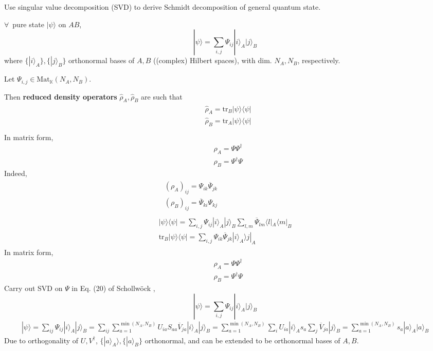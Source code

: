 \documentclass[10pt]{amsart}
\begin{document}
\begin{multicols*}{2}
Use singular value decomposition (SVD) to derive Schmidt decomposition of general quantum state. 

$\forall \, $ pure state $|\psi \rangle$ on $AB$, 
\[
|\psi \rangle = \sum_{i,j} \Psi_{ij}|i\rangle_A |j\rangle_B
\]
where $\lbrace |i\rangle_A \rbrace, \lbrace |j\rangle_B \rbrace$ orthonormal bases of $A,B$ ((complex) Hilbert spaces), with dim. $N_A,N_B$, respectively.  

Let $\Psi_{i,j} \in \text{Mat}_{\mathbb{K}}(N_A,N_B)$.  

Then \textbf{reduced density operators} $\widehat{\rho}_A,\widehat{\rho}_B$ are such that 
\[
\begin{gathered}
\begin{aligned} 
	& \widehat{\rho}_A = \text{tr}_B|\psi \rangle \langle \psi | \\ 
	& \widehat{\rho}_B = \text{tr}_A|\psi \rangle \langle \psi | \\ 
\end{aligned}
\end{gathered}
\]
In matrix form, 
\[
\begin{aligned}
	& \rho_A = \Psi \Psi^{\dag} \\ 
	& \rho_B = \Psi^{\dag} \Psi 
\end{aligned}
\]
Indeed, 
\[
\begin{gathered}
\begin{aligned} 
	& (\rho_A)_{ij} = \Psi_{ik} \overline{\Psi}_{jk} \\
	& (\rho_B)_{ij} = \overline{\Psi}_{ki}  \Psi_{kj} \end{aligned} \\
\begin{gathered}
|\psi \rangle \langle \psi | = \sum_{i,j} \Psi_{ij} |i\rangle_A |j\rangle_B \sum_{l,m} \overline{\Psi}_{lm}\langle l |_A \langle m |_B \\
\text{tr}_B|\psi \rangle \langle \psi | = \sum_{i,j} \Psi_{ik} \overline{\Psi}_{jk} |i \rangle_A \rangle j |_A
\end{gathered}
\end{gathered}
\]
In matrix form, 
\[
\begin{aligned}
	& \rho_A = \Psi \Psi^{\dag} \\ 
	&  \rho_B = \Psi^{\dag} \Psi
\end{aligned}
\]
Carry out SVD on $\Psi$ in Eq. (20) of Schollw\"{o}ck \cite{Scho2010}, 
\[
|\psi \rangle = \sum_{i,j} \Psi_{ij} |i\rangle_A |j\rangle_B
\]
\[
\begin{gathered}
|\psi \rangle = \sum_{ij} \Psi_{ij} | i \rangle_A |j \rangle_B = \sum_{ij} \sum_{a=1}^{\min{(N_A,N_B)}} U_{ia} S_{aa} \overline{V}_{ja} |i \rangle_A | j \rangle_B = \sum_{a=1}^{ \min{(N_A,N_B)}} \sum_i U_{ia} | i \rangle_A s_a \sum_j \overline{V}_{ja} | j \rangle_B = \sum_{a=1}^{ \min{ (N_A,N_B)} } s_a |a \rangle_A |a\rangle_B
\end{gathered}
\]
Due to orthogonality of $U,V^{\dag}$, $\lbrace |a \rangle_A \rangle, \lbrace | a \rangle_B \rbrace$ orthonormal, and can be extended to be orthonormal bases of $A,B$.  


\end{multicols*}
\end{document}
